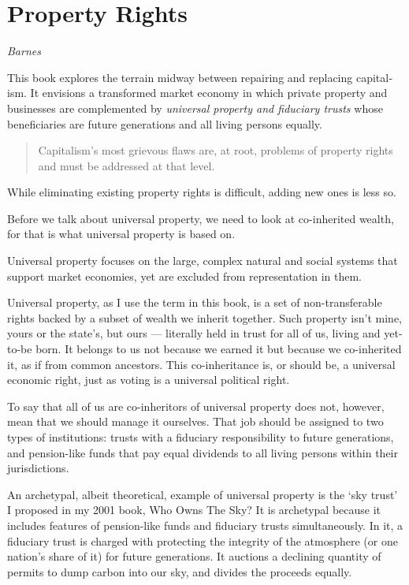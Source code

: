 \documentclass[
]{book}
\begin{document}
\hypertarget{property-rights}{%
\section{Property Rights}\label{property-rights}}

\emph{Barnes}

This book explores the terrain midway between repairing and re­pla­cing capi­tal­ism. It envisions a transformed market economy in which private pro­perty and busi­nesses are complemented by \emph{universal property and fiduciary trusts} whose beneficiaries are future generations and all living persons equally.

\begin{quote}
Capitalism's most grievous flaws are, at root, problems of property rights and must be addressed at that level.
\end{quote}

While eliminating exist­ing pro­perty rights is difficult, adding new ones is less so.

Before we talk about universal property, we need to look at co-inherited wealth, for that is what universal property is based on.

Universal property focuses on the large, complex natural and social systems that support market economies, yet are excluded from repre­sentation in them.

Universal property, as I use the term in this book, is a set of non-transferable rights backed by a subset of wealth we inherit toge­ther. Such property isn't mine, yours or the state's, but ours --- literally held in trust for all of us, living and yet-to-be born. It belongs to us not because we earned it but because we co-inherited it, as if from common ances­tors. This co-inheritance is, or should be, a uni­­versal econ­omic right, just as voting is a universal political right.

To say that all of us are co-inheritors of universal property does not, however, mean that we should manage it ourselves. That job should be assigned to two types of institutions: trusts with a fiduciary responsibility to future genera­tions, and pension-like funds that pay equal divi­dends to all living persons within their jurisdictions.

An archetypal, albeit theoretical, example of universal property is the `sky trust' I pro­posed in my 2001 book, Who Owns The Sky? It is arche­typal because it includes features of pension-like funds and fiduciary trusts simultaneously. In it, a fiduciary trust is charged with protect­ing the integrity of the atmo­sphere (or one nation's share of it) for future generations. It auctions a de­clining quantity of permits to dump carbon into our sky, and divides the proceeds equally.
\end{document}
